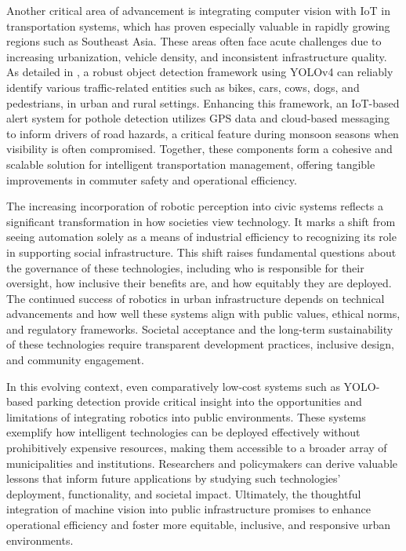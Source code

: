 \documentclass[conference]{IEEEtran}
\begin{document}
Another critical area of advancement is integrating computer vision with IoT in transportation systems, 
which has proven especially valuable in rapidly growing regions such as Southeast Asia. 
These areas often face acute challenges due to increasing urbanization, 
vehicle density, 
and inconsistent infrastructure quality. 
As detailed in \cite{real_time_transport}, 
a robust object detection framework using YOLOv4 can reliably identify various traffic-related entities such as bikes, 
cars, 
cows, 
dogs, 
and pedestrians, 
in urban and rural settings. 
Enhancing this framework, 
an IoT-based alert system for pothole detection utilizes GPS data and cloud-based messaging to inform drivers of road hazards, 
a critical feature during monsoon seasons when visibility is often compromised. 
Together, 
these components form a cohesive and scalable solution for intelligent transportation management, 
offering tangible improvements in commuter safety and operational efficiency.

The increasing incorporation of robotic perception into civic systems reflects a significant transformation in how societies view technology. 
It marks a shift from seeing automation solely as a means of industrial efficiency to recognizing its role in supporting social infrastructure. 
This shift raises fundamental questions about the governance of these technologies, 
including who is responsible for their oversight, 
how inclusive their benefits are, 
and how equitably they are deployed. 
The continued success of robotics in urban infrastructure depends on technical advancements and how well these systems align with public values, 
ethical norms, 
and regulatory frameworks. 
Societal acceptance and the long-term sustainability of these technologies require transparent development practices, 
inclusive design, 
and community engagement.

In this evolving context, 
even comparatively low-cost systems such as YOLO-based parking detection provide critical insight into the opportunities and limitations of integrating robotics into public environments. 
These systems exemplify how intelligent technologies can be deployed effectively without prohibitively expensive resources, 
making them accessible to a broader array of municipalities and institutions. 
Researchers and policymakers can derive valuable lessons that inform future applications by studying such technologies' deployment, 
functionality, 
and societal impact. 
Ultimately, 
the thoughtful integration of machine vision into public infrastructure promises to enhance operational efficiency and foster more equitable, 
inclusive, 
and responsive urban environments.
\end{document}
